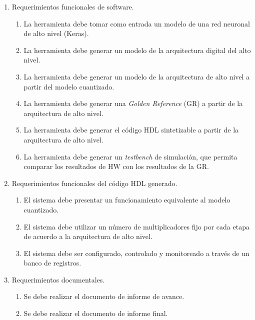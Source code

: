 \documentclass[11pt]{charter}
\begin{document}
\begin{enumerate}
\item Requerimientos funcionales de software. 
	\begin{enumerate}
	\item La herramienta debe tomar como entrada un modelo de una red neuronal de alto nivel (Keras).
	\item La herramienta debe generar un modelo de la arquitectura digital del alto nivel.
	\item La herramienta debe generar un modelo de la arquitectura de alto nivel a partir del modelo cuantizado.
	\item La herramienta debe generar una \textit{Golden Reference} (GR) a partir de la arquitectura de alto nivel.
	\item La herramienta debe generar el código HDL sintetizable a partir de la arquitectura de alto nivel.
	\item La herramienta debe generar un \textit{testbench} de simulación, que permita comparar los resultados de HW con los resultados de la GR.
	\end{enumerate}

\item Requerimientos funcionales del código HDL generado. 
	\begin{enumerate}
	\item El sistema debe presentar un funcionamiento equivalente al modelo cuantizado.
	\item El sistema debe utilizar un número de multiplicadores fijo por cada etapa de acuerdo a la arquitectura de alto nivel.
	\item El sistema debe ser configurado, controlado y monitoreado a través de un banco de registros.
	\end{enumerate}

\item Requerimientos documentales. 
	\begin{enumerate}
	
	\item Se debe realizar el documento de informe de avance.
	\item Se debe realizar el documento de informe final.
	\end{enumerate}

\end{enumerate}
\end{document}
